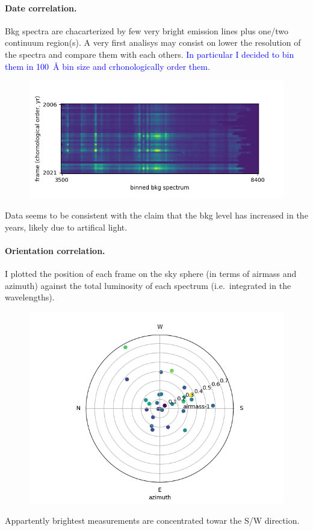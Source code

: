 \documentclass{article}
\newcommand{\arbitrario}[1]{\textcolor{blue}{#1}}
\begin{document}
\paragraph{Date correlation.}
Bkg spectra are chacarterized by few very bright emission lines plus one/two continuum region(s). A very first analisys may consist on lower the resolution of the spectra and compare them with each others. \arbitrario{In particular I decided to bin them in \SI{100}{\angstrom} bin size and crhonologically order them.}
\begin{figure}[h!]
	\centering
	\includegraphics[width=.75\textwidth]{../Figure_1}
\end{figure}
Data seems to be consistent with the claim that the bkg level has increased in the years, likely due to artifical light.

\paragraph{Orientation correlation.} I plotted the position of each frame on the sky sphere (in terms of airmass and azimuth) against the total luminosity of each spectrum (i.e.\ integrated in the wavelengths).
\begin{figure}[h!]
	\centering
	\includegraphics[width=.75\textwidth]{../radial}
\end{figure}
Appartently brightest measurements are concentrated towar the S/W direction.
\end{document}
